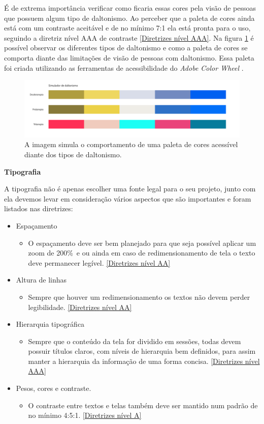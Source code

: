 {É de extrema importância verificar como ficaria essas cores pela visão de pessoas que possuem algum tipo de daltonismo. Ao perceber que a paleta de cores ainda está com um contraste aceitável e de no mínimo 7:1 ela está pronta para o uso, seguindo a diretriz nível AAA de contraste \ref{Diretrizes nível AAA}. Na figura \ref{fig2:style} é possível observar os diferentes tipos de daltonismo e como a paleta de cores se comporta diante das limitações de visão de pessoas com daltonismo. Essa paleta foi criada utilizando as ferramentas de acessibilidade do \textit{Adobe Color Wheel} \cite{ADOBE}.
 \begin{figure}[ht]
        \centering
    	\includegraphics[width=1.0\textwidth]{images/paleta_daltonismo.png}
        \caption{A imagem simula o comportamento de uma paleta de cores acessível diante dos tipos de daltonismo.}
        \label{fig2:style}
\end{figure}  


\newpage

{\centerline{\textbf{Tipografia}}}
A tipografia não é apenas escolher uma fonte legal para o seu projeto, junto com ela devemos levar em consideração vários aspectos que são importantes e foram listados nas diretrizes: 
\begin{itemize}
    \item Espaçamento
    \begin{itemize}
        \item O espaçamento deve ser bem planejado para que seja possível aplicar um zoom de 200\%\ e ou ainda em caso de redimensionamento de tela o texto deve permanecer legível. \ref{Diretrizes nível AA}
    \end{itemize}
    \item Altura de linhas
    \begin{itemize}
        \item Sempre que houver um redimensionamento os textos não devem perder legibilidade. \ref{Diretrizes nível AA}
    \end{itemize}
    \item Hierarquia tipográfica
    \begin{itemize}
        \item Sempre que o conteúdo da tela for dividido em sessões, todas devem possuir títulos claros, com níveis de hierarquia bem definidos, para assim manter a hierarquia da informação de uma forma concisa. \ref{Diretrizes nível AAA}
    \end{itemize}
    \item Pesos, cores e contraste. 
    \begin{itemize}
        \item O contraste entre textos e telas também deve ser mantido num padrão de no mínimo 4:5:1. \ref{Diretrizes nível A}
    \end{itemize}
\end{itemize}

}
